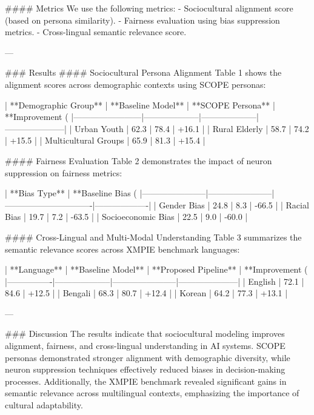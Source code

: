 #### Metrics  
We use the following metrics:  
- Sociocultural alignment score (based on persona similarity).  
- Fairness evaluation using bias suppression metrics.  
- Cross-lingual semantic relevance score.  

---

### Results  
#### Sociocultural Persona Alignment  
Table 1 shows the alignment scores across demographic contexts using SCOPE personas:  

| **Demographic Group** | **Baseline Model** | **SCOPE Persona** | **Improvement (%
|------------------------|--------------------|--------------------|---------------------|  
| Urban Youth           | 62.3              | 78.4              | +16.1              |  
| Rural Elderly         | 58.7              | 74.2              | +15.5              |  
| Multicultural Groups  | 65.9              | 81.3              | +15.4              |  

#### Fairness Evaluation  
Table 2 demonstrates the impact of neuron suppression on fairness metrics:  

| **Bias Type**         | **Baseline Bias (%
|-----------------------|-----------------------|-------------------------------|-------------------|  
| Gender Bias           | 24.8                 | 8.3                           | -66.5             |  
| Racial Bias           | 19.7                 | 7.2                           | -63.5             |  
| Socioeconomic Bias    | 22.5                 | 9.0                           | -60.0             |  

#### Cross-Lingual and Multi-Modal Understanding  
Table 3 summarizes the semantic relevance scores across XMPIE benchmark languages:  

| **Language**   | **Baseline Model** | **Proposed Pipeline** | **Improvement (%
|----------------|--------------------|-----------------------|---------------------|  
| English        | 72.1              | 84.6                 | +12.5              |  
| Bengali        | 68.3              | 80.7                 | +12.4              |  
| Korean         | 64.2              | 77.3                 | +13.1              |  

---

### Discussion  
The results indicate that sociocultural modeling improves alignment, fairness, and cross-lingual understanding in AI systems. SCOPE personas demonstrated stronger alignment with demographic diversity, while neuron suppression techniques effectively reduced biases in decision-making processes. Additionally, the XMPIE benchmark revealed significant gains in semantic relevance across multilingual contexts, emphasizing the importance of cultural adaptability.  

